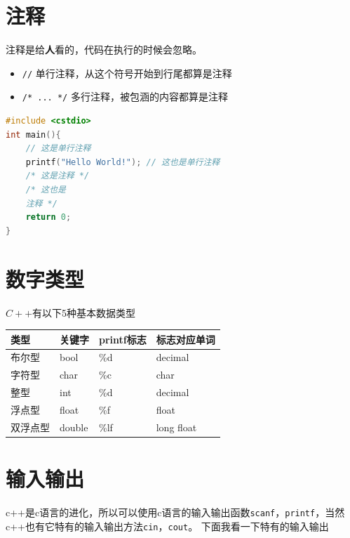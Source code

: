 \documentclass[
  paper=a4,
  ,captions=tableheading
]{scrbook}
\newcommand{\passthrough}[1]{#1}
\providecommand{\tightlist}{%
  \setlength{\itemsep}{0pt}\setlength{\parskip}{0pt}}
\begin{document}
\hypertarget{ux6ce8ux91ca}{%
\section{注释}\label{ux6ce8ux91ca}}

注释是给\textbf{人}看的，代码在执行的时候会忽略。

\begin{itemize}
\tightlist
\item
  \passthrough{\lstinline!//!} 单行注释，从这个符号开始到行尾都算是注释
\item
  \passthrough{\lstinline!/* ... */!} 多行注释，被包涵的内容都算是注释
\end{itemize}

\begin{lstlisting}[language={C++}]
#include <cstdio>
int main(){
    // 这是单行注释
    printf("Hello World!"); // 这也是单行注释
    /* 这是注释 */
    /* 这也是
    注释 */
    return 0;
}
\end{lstlisting}

\hypertarget{ux6570ux5b57ux7c7bux578b}{%
\section{数字类型}\label{ux6570ux5b57ux7c7bux578b}}

\(C++\)有以下5种基本数据类型

\begin{longtable}[]{@{}llll@{}}
\toprule
类型 & 关键字 & printf标志 & 标志对应单词 \\
\midrule
\endhead
布尔型 & bool & \%d & decimal \\
字符型 & char & \%c & char \\
整型 & int & \%d & decimal \\
浮点型 & float & \%f & float \\
双浮点型 & double & \%lf & long float \\
\bottomrule
\end{longtable}

\hypertarget{ux8f93ux5165ux8f93ux51fa}{%
\section{输入输出}\label{ux8f93ux5165ux8f93ux51fa}}

c++是c语言的进化，所以可以使用c语言的输入输出函数\passthrough{\lstinline!scanf!}，\passthrough{\lstinline!printf!}，当然c++也有它特有的输入输出方法\passthrough{\lstinline!cin!}，\passthrough{\lstinline!cout!}。
下面我看一下特有的输入输出
\end{document}
